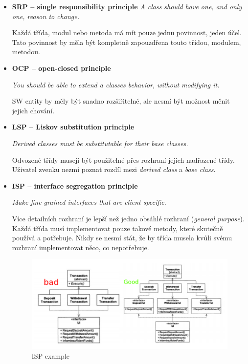 \documentclass{szzclass}
\begin{document}
\begin{itemize}
      \item \textbf{SRP -- single responsibility principle}
      \textit{A class should have one, and only one, reason to change.}

      Každá třída, modul nebo metoda má mít pouze jednu povinnost, jeden účel.
      Tato povinnost by měla být kompletně zapouzdřena touto třídou, modulem, metodou.

      \item \textbf{OCP -- open-closed principle}

      \textit{You should be able to extend a classes behavior, without modifying it.}

      SW entity by měly být snadno rozšiřitelné, ale nesmí být možnost měnit jejich chování.

      \item \textbf{LSP -- Liskov substitution principle}

      \textit{Derived classes must be substitutable for their base classes.}

      Odvozené třídy musejí být použitelné přes rozhraní jejich nadřazené třídy.
      Uživatel zvenku nezmí poznat rozdíl mezi \textit{derived class} a \textit{base class}.

      \item \textbf{ISP -- interface segregation principle}

      \textit{Make fine grained interfaces that are client specific.}

      Více detailních rozhraní je lepší než jedno obsáhlé rozhraní (\textit{general purpose}).
      Každá třída musí implementovat pouze takové metody, které skutečně používá a potřebuje.
      Nikdy se nesmí stát, že by třída musela kvůli svému rozhraní implementovat něco, co nepotřebuje.
      \begin{figure}[ht]
            \centering
            \includegraphics[width=1\textwidth]{topics/bi-wsi-si-9/isp.png}
            \caption{ISP example}
      \end{figure}


\end{itemize}
\end{document}
